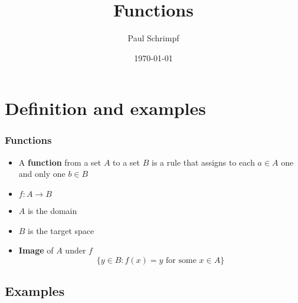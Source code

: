 \documentclass[compress]{beamer}
\title{Functions}
\author{Paul Schrimpf}
\institute{UBC \\ Economics 526}
\date{\today}
\renewcommand{\to}{{\rightarrow}}
\begin{document}
\frame{\titlepage}

\begin{frame}
  \tableofcontents  
\end{frame}


\maketitle

\section{Definition and examples}

\begin{frame}
  \frametitle{Functions}
  \begin{itemize}
  \item  A \textbf{function} from a set $A$
    to a set $B$ is a rule that assigns to each $a \in A$ one and only one
    $b \in B$ 
  \item $f:A \to B$
  \item $A$ is the domain
  \item $B$ is the target space
  \item \textbf{Image} of $A$ under $f$
    \[ \{y  \in B:  f(x) = y \text{ for some } x \in A \} \]
  \end{itemize}
\end{frame}
\subsection{Examples}
\end{document}
